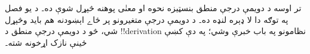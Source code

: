 \documentclass[../../../include/open-logic-chapter]{subfiles}
\begin{document}

\begin{editorial}
تر اوسه د دويمې درجې منطق بنسټيزه نحوه او معنٰی پوهنه څېړل شوې ده۔
د يو فصل په توګه دا لا ډېره لنډه ده۔ د دويمې درجې متغيرونو پر ځاے
اېښودنه هم بايد وڅېړل شي، څو د دويمې درجې منطق د !!{derivation}
نظامونو په باب خبرې وشي؛ په دې کښې ځينې نازک اړخونه شته۔
\end{editorial}







\OLEndChapterHook
\end{document}
